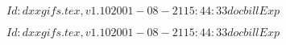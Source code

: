 \documentclass{article}
\begin{document}
$Id: dxxgifs.tex,v 1.10 2001-08-21 15:44:33 docbill Exp $


\pagebreak


$Id: dxxgifs.tex,v 1.10 2001-08-21 15:44:33 docbill Exp $


\pagebreak
\end{document}
